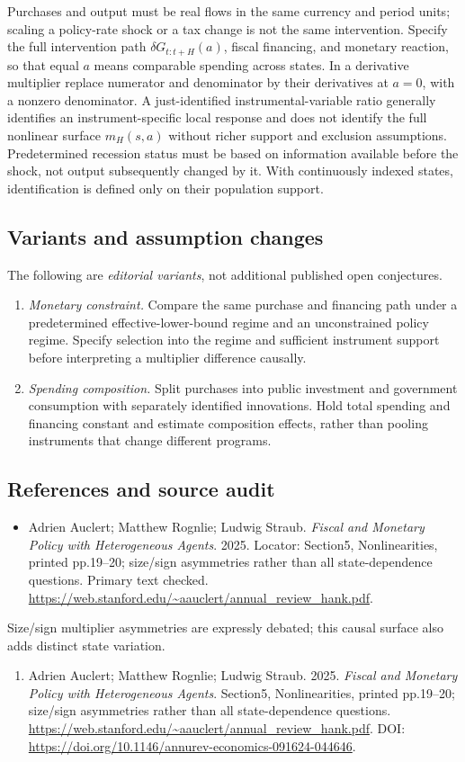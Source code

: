\documentclass[11pt,a4paper]{article}
\begin{document}
Purchases and output must be real flows in the same currency and period units; scaling a policy-rate shock or a tax change is not the same intervention. Specify the full intervention path \(\delta G_{t:t+H}(a)\), fiscal financing, and monetary reaction, so that equal \(a\) means comparable spending across states. In a derivative multiplier replace numerator and denominator by their derivatives at \(a=0\), with a nonzero denominator. A just-identified instrumental-variable ratio generally identifies an instrument-specific local response and does not identify the full nonlinear surface \(m_H(s,a)\) without richer support and exclusion assumptions. Predetermined recession status must be based on information available before the shock, not output subsequently changed by it. With continuously indexed states, identification is defined only on their population support.
\subsection*{Variants and assumption changes}
The following are \emph{editorial variants}, not additional published open conjectures.
\begin{enumerate}
\item \emph{Monetary constraint.} Compare the same purchase and financing path under a predetermined effective-lower-bound regime and an unconstrained policy regime. Specify selection into the regime and sufficient instrument support before interpreting a multiplier difference causally.
\item \emph{Spending composition.} Split purchases into public investment and government consumption with separately identified innovations. Hold total spending and financing constant and estimate composition effects, rather than pooling instruments that change different programs.
\end{enumerate}
\subsection*{References and source audit}
\begin{itemize}
\item Adrien Auclert; Matthew Rognlie; Ludwig Straub. \emph{Fiscal and Monetary Policy with Heterogeneous Agents}. 2025. Locator: Section5, Nonlinearities, printed pp.19--20; size/sign asymmetries rather than all state-dependence questions. Primary text checked. \url{https://web.stanford.edu/~aauclert/annual_review_hank.pdf}.
\end{itemize}
Size/sign multiplier asymmetries are expressly debated; this causal surface also adds distinct state variation.
\begin{enumerate}\raggedright
\item\hypertarget{definitions:source:30007532:1}{} Adrien Auclert; Matthew Rognlie; Ludwig Straub. 2025. \emph{Fiscal and Monetary Policy with Heterogeneous Agents}. Section5, Nonlinearities, printed pp.19--20; size/sign asymmetries rather than all state-dependence questions.
\url{https://web.stanford.edu/~aauclert/annual_review_hank.pdf}.
DOI: \url{https://doi.org/10.1146/annurev-economics-091624-044646}.
\end{enumerate}
\end{document}
